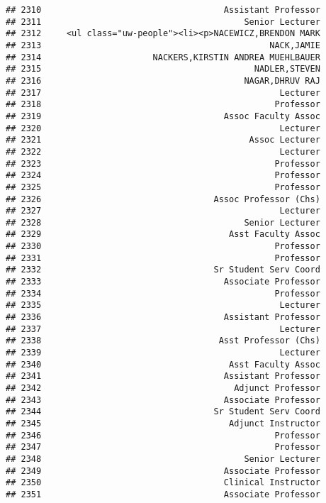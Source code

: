 \documentclass[
]{article}
\begin{document}
\begin{verbatim}
## 2310                                    Assistant Professor
## 2311                                        Senior Lecturer
## 2312     <ul class="uw-people"><li><p>NACEWICZ,BRENDON MARK
## 2313                                             NACK,JAMIE
## 2314                      NACKERS,KIRSTIN ANDREA MUEHLBAUER
## 2315                                          NADLER,STEVEN
## 2316                                        NAGAR,DHRUV RAJ
## 2317                                               Lecturer
## 2318                                              Professor
## 2319                                    Assoc Faculty Assoc
## 2320                                               Lecturer
## 2321                                         Assoc Lecturer
## 2322                                               Lecturer
## 2323                                              Professor
## 2324                                              Professor
## 2325                                              Professor
## 2326                                  Assoc Professor (Chs)
## 2327                                               Lecturer
## 2328                                        Senior Lecturer
## 2329                                     Asst Faculty Assoc
## 2330                                              Professor
## 2331                                              Professor
## 2332                                  Sr Student Serv Coord
## 2333                                    Associate Professor
## 2334                                              Professor
## 2335                                               Lecturer
## 2336                                    Assistant Professor
## 2337                                               Lecturer
## 2338                                   Asst Professor (Chs)
## 2339                                               Lecturer
## 2340                                     Asst Faculty Assoc
## 2341                                    Assistant Professor
## 2342                                      Adjunct Professor
## 2343                                    Associate Professor
## 2344                                  Sr Student Serv Coord
## 2345                                     Adjunct Instructor
## 2346                                              Professor
## 2347                                              Professor
## 2348                                        Senior Lecturer
## 2349                                    Associate Professor
## 2350                                    Clinical Instructor
## 2351                                    Associate Professor

\end{verbatim}
\end{document}

